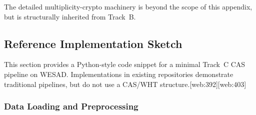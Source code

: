 \documentclass[11pt]{article}
\begin{document}
The detailed multiplicity-crypto machinery is beyond the scope of this appendix, but is structurally inherited from Track~B.

\subsection{Reference Implementation Sketch}

This section provides a Python-style code snippet for a minimal Track~C CAS pipeline on WESAD. Implementations in existing repositories demonstrate traditional pipelines, but do not use a CAS/WHT structure.\cite{WESAD_JohnsonGitHub,WESAD_MMIImplementation}[web:392][web:403]

\subsubsection{Data Loading and Preprocessing}
\end{document}
